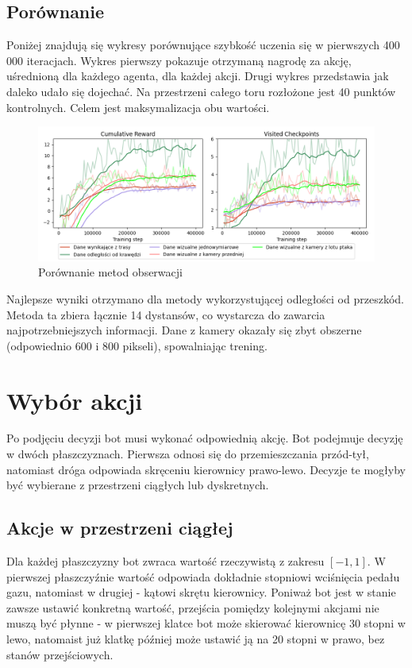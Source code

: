 \subsection{Porównanie}
Poniżej znajdują się wykresy porównujące szybkość uczenia się w pierwszych 400 000 iteracjach. Wykres pierwszy pokazuje otrzymaną nagrodę za akcję, uśrednioną dla każdego agenta, dla każdej akcji. Drugi wykres przedstawia jak daleko udało się dojechać. Na przestrzeni całego toru rozłożone jest 40 punktów kontrolnych. Celem jest maksymalizacja obu wartości.
\begin{figure}[H]
    \centering
    \includegraphics[width=\textwidth]{graphs/input_observations}
    \caption{Porównanie metod obserwacji}
    \label{fig}
\end{figure}
Najlepsze wyniki otrzymano dla metody wykorzystującej odległości od przeszkód. Metoda ta zbiera łącznie 14 dystansów, co wystarcza do zawarcia najpotrzebniejszych informacji. Dane z kamery okazały się zbyt obszerne (odpowiednio 600 i 800 pikseli), spowalniając trening.
\clearpage
\section{Wybór akcji}
Po podjęciu decyzji bot musi wykonać odpowiednią akcję. Bot podejmuje decyzję w dwóch płaszczyznach. Pierwsza odnosi się do przemieszczania przód-tył, natomiast dróga odpowiada skręceniu kierownicy prawo-lewo. Decyzje te mogłyby być wybierane z przestrzeni ciągłych lub dyskretnych.

\subsection{Akcje w przestrzeni ciągłej}
Dla każdej płaszczyzny bot zwraca wartość rzeczywistą z zakresu $[-1, 1]$. W pierwszej płaszczyźnie wartość odpowiada dokładnie stopniowi wciśnięcia pedału gazu, natomiast w drugiej - kątowi skrętu kierownicy. Poniważ bot jest w stanie zawsze ustawić konkretną wartość, przejścia pomiędzy kolejnymi akcjami nie muszą być płynne - w pierwszej klatce bot może skierować kierownicę 30 stopni w lewo, natomaist już klatkę później może ustawić ją na 20 stopni w prawo, bez stanów przejściowych.

